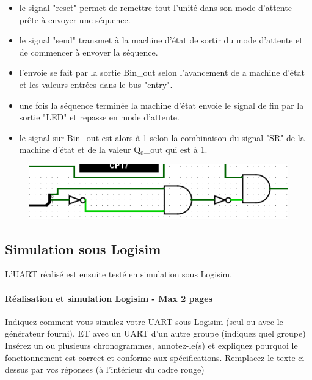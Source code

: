 \documentclass[a4paper]{article} %
\begin{document}
\begin{tcolorbox}[colframe=Monokaimagenta,colback=white, breakable, enhanced]
\begin{itemize}
	\item le signal "reset" permet de remettre tout l'unité dans son mode d'attente prête à envoyer une séquence.
	\item le signal "send" transmet à la machine d'état de sortir du mode d'attente et de commencer à envoyer la séquence.
	\item l'envoie se fait par la sortie Bin\_out selon l'avancement de a machine d'état et les valeurs entrées dans le bus "entry".
	\item une fois la séquence terminée la machine d'état envoie le signal de fin par la sortie "LED" et repasse en mode d'attente.
	\item le signal sur Bin\_out est alors à 1 selon la combinaison du signal "SR" de la machine d'état et de la valeur Q$_0$\_out qui est à 1.
\end{itemize}
\begin{figure}[H]
	\centering
	\includegraphics[scale=0.5]{src/bin_out_1}
	\label{fig:bin_out_1}
\end{figure}




\end{tcolorbox}
 \subsection{Simulation sous Logisim}
L’UART réalisé est ensuite testé en simulation sous Logisim.
\begin{tcolorbox}[colframe=Monokaimagenta,colback=white, breakable, enhanced]
\paragraph{Réalisation et simulation Logisim - Max 2 pages}
Indiquez comment vous simulez votre UART sous Logisim (seul ou avec le générateur fourni), ET avec un UART d’un autre groupe (indiquez quel groupe)
Insérez un ou plusieurs chronogrammes, annotez-le(s) et expliquez pourquoi le fonctionnement est correct et conforme aux spécifications.
Remplacez le texte ci-dessus par vos réponses (à l’intérieur du cadre rouge)
\\
\end{tcolorbox}
\end{document}

